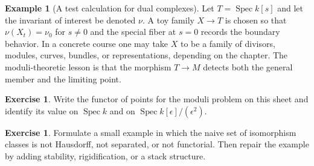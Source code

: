 \documentclass[11pt]{amsart}
\theoremstyle{definition}
\newtheorem{example}[theorem]{Example}
\newtheorem{exercise}[theorem]{Exercise}
\newcommand{\Spec}{\operatorname{Spec}}
\begin{document}
\begin{example}[A test calculation for dual complexes]
Let $T=\Spec k[s]$ and let the invariant of interest be denoted $\nu$.  A toy family $X\to T$ is chosen so that $\nu(X_t)=\nu_0$ for $s\ne0$ and the special fiber at $s=0$ records the boundary behavior.  In a concrete course one may take $X$ to be a family of divisors, modules, curves, bundles, or representations, depending on the chapter.  The moduli-theoretic lesson is that the morphism $T\to M$ detects both the general member and the limiting point.
\end{example}
\begin{exercise}
Write the functor of points for the moduli problem on this sheet and identify its value on $\Spec k$ and on $\Spec k[\epsilon]/(\epsilon^2)$.
\end{exercise}
\begin{exercise}
Formulate a small example in which the naive set of isomorphism classes is not Hausdorff, not separated, or not functorial.  Then repair the example by adding stability, rigidification, or a stack structure.
\end{exercise}
\clearpage
\end{document}
